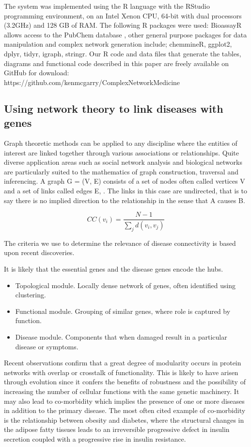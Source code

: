 \documentclass[authoryear,10pt,preprint]{elsarticle}
\begin{document}
The system was implemented using the R language with the RStudio programming environment, on an Intel Xenon CPU, 64-bit with dual processors (3.2GHz) and 128 GB of RAM. The following R packages were used: BioassayR allows access to the PubChem database \citep{Backman2016}, other general purpose packages for data manipulation and complex network generation include; chemmineR, ggplot2, dplyr, tidyr, igraph, stringr.  Our R code and data files that generate the tables, diagrams and functional code described in this paper are freely available on GitHub for download: \\https://github.com/kenmcgarry/ComplexNetworkMedicine

\subsection{Using network theory to link diseases with genes}
Graph theoretic methods can be applied to any discipline where the entities of interest are linked together through various associations or relationships.  Quite diverse application areas such as social network analysis and biological networks are particularly suited to the mathematics of graph construction, traversal and inferencing.
A graph G = (V, E) consists of a set of nodes often called vertices V and a set of links called edges E, . The links in this case are undirected, that is to say there is no implied direction to the relationship in the sense that A causes B.

\begin{equation}\label{closeness}
     CC(v_i) =  \frac{N - 1}{\sum_{j} d(v_i,v_j)}
\end{equation}

The criteria we use to determine the relevance of disease connectivity is based upon recent discoveries.

It is likely that the essential genes and the disease genes encode the hubs.

\begin{itemize}
\item Topological module. Locally dense network of genes, often identified using clustering.
\item Functional module. Grouping of similar genes, where role is captured by function.
\item Disease module. Components that when damaged result in a particular disease or symptoms.
\end{itemize}


Recent observations confirm that a great degree of modularity occurs in protein networks with overlap or crosstalk of functionality. This is likely to have arisen through evolution since it confers the benefits of robustness and the possibility of increasing the number of cellular functions with the same genetic machinery.  It may also lead to co-morbidity which implies the presence of one or more diseases in addition to the primary disease. The most often cited example of co-morbidity is the relationship between obesity and diabetes, where the structural changes in the adipose fatty tissues leads to an irreversible progressive defect in insulin secretion coupled with a progressive rise in insulin resistance. 
\end{document}
